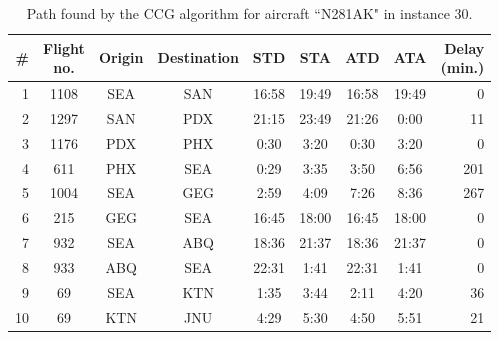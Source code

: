 \begin{table}[H]
	\centering
	\caption{Path found by the CCG algorithm for aircraft ``N281AK" in instance 30.}
	\SupplementTableSetup
\begin{tabular*}{\linewidth}{@{\extracolsep{\fill}}rcccccccr@{}}
		\toprule
		\#    & \shortstack{Flight\\no.} & Origin & Destination & STD & STA & ATD & ATA & \shortstack{Delay\\(min.)} \\
		\midrule
		1     & 1108  & SEA   & SAN   & 16:58 & 19:49 & 16:58 & 19:49 & 0 \\
		2     & 1297  & SAN   & PDX   & 21:15 & 23:49 & 21:26 & 0:00  & 11 \\
		3     & 1176  & PDX   & PHX   & 0:30  & 3:20  & 0:30  & 3:20  & 0 \\
		4     & 611   & PHX   & SEA   & 0:29  & 3:35  & 3:50  & 6:56  & 201 \\
		5     & 1004  & SEA   & GEG   & 2:59  & 4:09  & 7:26  & 8:36  & 267 \\
		6     & 215   & GEG   & SEA   & 16:45 & 18:00 & 16:45 & 18:00 & 0 \\
		7     & 932   & SEA   & ABQ   & 18:36 & 21:37 & 18:36 & 21:37 & 0 \\
		8     & 933   & ABQ   & SEA   & 22:31 & 1:41  & 22:31 & 1:41  & 0 \\
		9     & 69    & SEA   & KTN   & 1:35  & 3:44  & 2:11  & 4:20  & 36 \\
		10    & 69    & KTN   & JNU   & 4:29  & 5:30  & 4:50  & 5:51  & 21 \\
		\bottomrule
	\end{tabular*}
	\label{tab:path_for_N281AK}%
\end{table}

